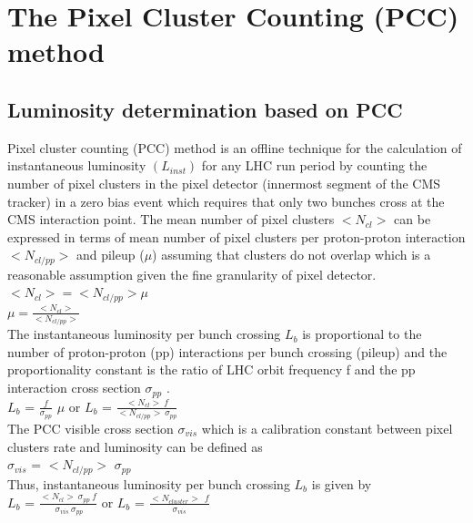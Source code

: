 \section{The Pixel Cluster Counting (PCC) method}
\label{sec:pcc}

\subsection{Luminosity determination based on PCC}
Pixel cluster counting (PCC)  method is an offline technique for the calculation of instantaneous luminosity $(L_{inst})$ for any LHC run period by counting the number of pixel clusters in the pixel detector (innermost segment of the CMS tracker) in a zero bias event which requires that only two bunches cross at the CMS interaction point. The mean number of pixel clusters $<N_{cl}>$ can be expressed in terms of mean number of pixel clusters per proton-proton interaction  $<N_{cl/pp}>$ and pileup ($\mu$) assuming that clusters do not overlap which is a reasonable assumption given the fine granularity of pixel detector. \\
  
$<N_{cl}> = <N_{cl/pp}> \mu$ \\

$\mu = \frac{<N_{cl}>}{<N_{cl/pp}>}$ \\

The instantaneous luminosity per bunch crossing $L_{b}$ is proportional to the number of proton-proton (pp) interactions per bunch crossing (pileup) and the proportionality constant is the ratio of  LHC orbit frequency f and the pp interaction cross section $\sigma_{pp}$ \cite{CMS-PAS-LUM-12-001}. \\

$L_{b}$ = $\frac{f}{\sigma_{pp}}$ $\mu$  or $L_{b}$ = $\frac{<N_{cl}> \: f }{<N_{cl/pp}> \: \sigma_{pp}}$ \\

The PCC visible cross section $\sigma_{vis}$ which is a calibration constant between pixel clusters rate and luminosity can be defined as \\

$\sigma_{vis}$ = $<N_{cl/pp}>$  $\sigma_{pp}$ \\

Thus, instantaneous luminosity per bunch crossing $L_b$ is given by \\

$L_{b}$ = $\frac{<N_{cl}> \: \sigma_{pp} \: f }{ \:\sigma_{vis} \: \sigma_{pp}}$ or $L_{b}$ = $\frac{<N_{cluster}> \:\: f}{\sigma_{vis}}$ \\


